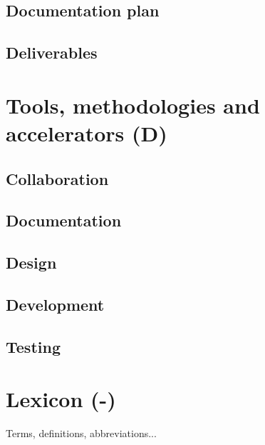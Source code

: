 \documentclass[a4paper,12pt,abstracton,titlepage]{scrartcl}
\begin{document}
\subsection{Documentation plan}
\subsection{Deliverables}

\section{Tools, methodologies and accelerators (D)}
\subsection{Collaboration}
\subsection{Documentation}
\subsection{Design}
\subsection{Development}
\subsection{Testing}

\newpage
\appendix
\section{Lexicon (-)}
Terms, definitions, abbreviations...
\end{document}
